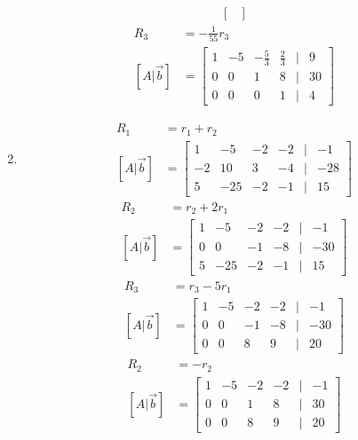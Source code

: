 \documentclass{article}
\begin{document}
\begin{enumerate}[label=\textbf{Set \arabic*}]
\begin{align*}
\begin{bmatrix}
			\end{bmatrix}
		\end{align*}
		\begin{align*}
			R_3 & = -\frac{1}{55}r_3 \\
			[A|\vec{b}] & = \begin{bmatrix}
				1 & -5 & -\frac{5}{3} & \frac{2}{3} & | & 9 \\
				0 & 0 & 1 & 8 & | & 30 \\
				0 & 0 & 0 & 1 & | & 4
			\end{bmatrix}
		\end{align*}
	\item
		\begin{align*}
			R_1 & = r_1 + r_2 \\
			[A|\vec{b}] & = \begin{bmatrix}
				1 & -5 & -2 & -2 & | & -1 \\
				-2 & 10 & 3 & -4 & | & -28 \\
				5 & -25 & -2 & -1 & | & 15
			\end{bmatrix}
		\end{align*}
		\begin{align*}
			R_2 & = r_2 + 2r_1 \\
			[A|\vec{b}] & = \begin{bmatrix}
				1 & -5 & -2 & -2 & | & -1 \\
				0 & 0 & -1 & -8 & | & -30 \\
				5 & -25 & -2 & -1 & | & 15
			\end{bmatrix}
		\end{align*}
		\begin{align*}
			R_3 & = r_3 - 5r_1 \\
			[A|\vec{b}] & = \begin{bmatrix}
				1 & -5 & -2 & -2 & | & -1 \\
				0 & 0 & -1 & -8 & | & -30 \\
				0 & 0 & 8 & 9 & | & 20
			\end{bmatrix}
		\end{align*}
		\begin{align*}
			R_2 & = -r_2 \\
			[A|\vec{b}] & = \begin{bmatrix}
				1 & -5 & -2 & -2 & | & -1 \\
				0 & 0 & 1 & 8 & | & 30 \\
				0 & 0 & 8 & 9 & | & 20
			\end{bmatrix}
		\end{align*}
		\begin{align*}

\end{align*}
\end{enumerate}
\end{document}
